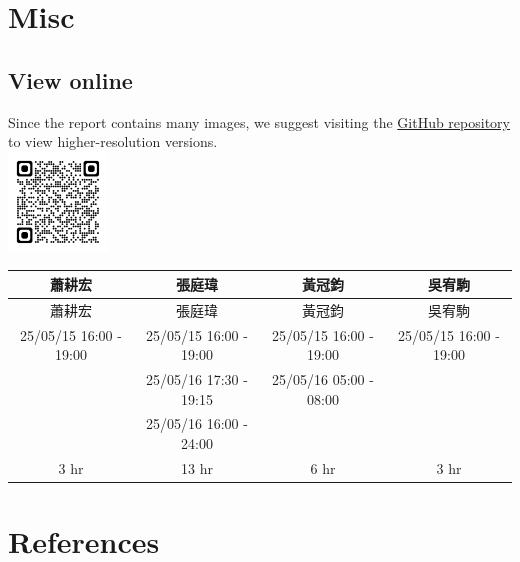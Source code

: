 \documentclass[12pt]{article}
\begin{document}


    \section{Misc}

    \subsection{View online}
    Since the report contains many images, we suggest visiting the \href{https://github.com/CSIEHaTerX/Dr.UML/}{GitHub repository} to view higher-resolution versions.\\
    \includegraphics[]{assets/repoQRCode}
    \\

    \begin{CJK*}{UTF8}{bsmi}
        \begin{longtable}{c|c|c|c|}
            \hline
            蕭耕宏                    & 張庭瑋                    & 黃冠鈞                    & 吳宥駒                    \\
            \hline
            \endfirsthead
            \hline
            蕭耕宏                    & 張庭瑋                    & 黃冠鈞                    & 吳宥駒                    \\
            \hline
            \endhead
            \hline
            25/05/15 16:00 - 19:00 & 25/05/15 16:00 - 19:00 & 25/05/15 16:00 - 19:00 & 25/05/15 16:00 - 19:00 \\
            \hline
            & 25/05/16 17:30 - 19:15 & 25/05/16 05:00 - 08:00 &                        \\
            \hline
            & 25/05/16 16:00 - 24:00 &                        &                        \\
            \hline
            3 hr                   & 13 hr                  & 6 hr                   & 3 hr                   \\
            \hline
        \end{longtable}
    \end{CJK*}



    \section*{References}

    \printbibliography[heading=none]
\end{document}
